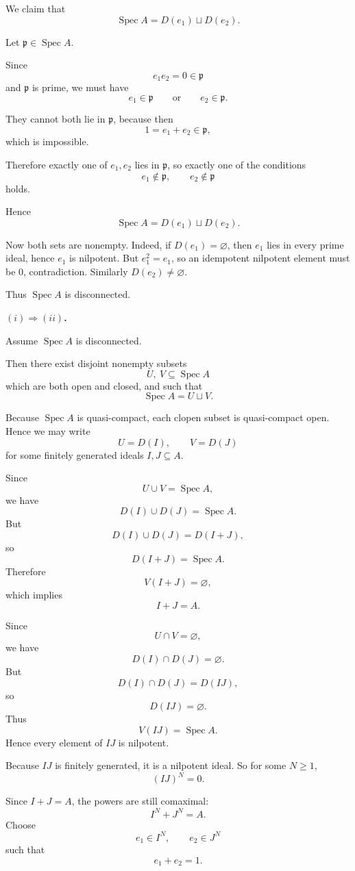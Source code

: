 \documentclass[12pt,a4paper]{article}
\DeclareMathOperator{\Spec}{Spec}
\theoremstyle{plain}
\theoremstyle{definition}      %
\begin{document}
	We claim that
	\[
	\Spec A = D(e_1)\sqcup D(e_2).
	\]
	
	Let \(\mathfrak p\in \Spec A\).
	
	Since
	\[
	e_1e_2=0\in \mathfrak p
	\]
	and \(\mathfrak p\) is prime, we must have
	\[
	e_1\in \mathfrak p
	\qquad\text{or}\qquad
	e_2\in \mathfrak p.
	\]
	
	They cannot both lie in \(\mathfrak p\), because then
	\[
	1=e_1+e_2\in \mathfrak p,
	\]
	which is impossible.
	
	Therefore exactly one of \(e_1,e_2\) lies in \(\mathfrak p\), so exactly one of the conditions
	\[
	e_1\notin \mathfrak p,
	\qquad
	e_2\notin \mathfrak p
	\]
	holds.
	
	Hence
	\[
	\Spec A = D(e_1)\sqcup D(e_2).
	\]
	
	Now both sets are nonempty.
	Indeed, if \(D(e_1)=\varnothing\), then \(e_1\) lies in every prime ideal, hence \(e_1\) is nilpotent.
	But \(e_1^2=e_1\), so an idempotent nilpotent element must be \(0\), contradiction.
	Similarly \(D(e_2)\neq\varnothing\).
	
	Thus \(\Spec A\) is disconnected.
	
	\bigskip
	\textbf{\((i)\Longrightarrow(ii)\).}
	
	Assume \(\Spec A\) is disconnected.
	
	Then there exist disjoint nonempty subsets
	\[
	U,\ V\subseteq \Spec A
	\]
	which are both open and closed, and such that
	\[
	\Spec A = U\sqcup V.
	\]
	
	Because \(\Spec A\) is quasi-compact, each clopen subset is quasi-compact open.
	Hence we may write
	\[
	U=D(I),
	\qquad
	V=D(J)
	\]
	for some finitely generated ideals \(I,J\subseteq A\).
	
	Since
	\[
	U\cup V=\Spec A,
	\]
	we have
	\[
	D(I)\cup D(J)=\Spec A.
	\]
	But
	\[
	D(I)\cup D(J)=D(I+J),
	\]
	so
	\[
	D(I+J)=\Spec A.
	\]
	Therefore
	\[
	V(I+J)=\varnothing,
	\]
	which implies
	\[
	I+J=A.
	\]
	
	Since
	\[
	U\cap V=\varnothing,
	\]
	we have
	\[
	D(I)\cap D(J)=\varnothing.
	\]
	But
	\[
	D(I)\cap D(J)=D(IJ),
	\]
	so
	\[
	D(IJ)=\varnothing.
	\]
	Thus
	\[
	V(IJ)=\Spec A.
	\]
	Hence every element of \(IJ\) is nilpotent.
	
	Because \(IJ\) is finitely generated, it is a nilpotent ideal.
	So for some \(N\ge 1\),
	\[
	(IJ)^N=0.
	\]
	
	Since \(I+J=A\), the powers are still comaximal:
	\[
	I^N+J^N=A.
	\]
	Choose
	\[
	e_1\in I^N,
	\qquad
	e_2\in J^N
	\]
	such that
	\[
	e_1+e_2=1.
	\]
	
\end{document}
